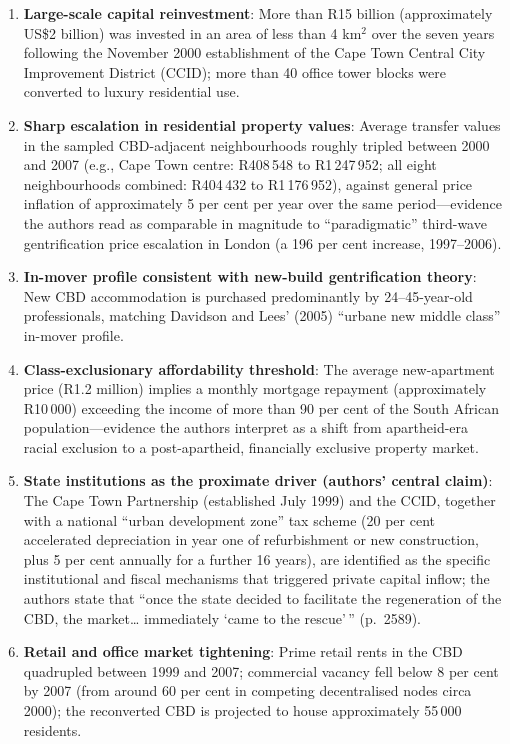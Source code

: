 \begin{enumerate}
  \item \textbf{Large-scale capital reinvestment}: More than R15 billion (approximately US\$2 billion) was invested in an area of less than 4 km$^2$ over the seven years following the November 2000 establishment of the Cape Town Central City Improvement District (CCID); more than 40 office tower blocks were converted to luxury residential use.
  \item \textbf{Sharp escalation in residential property values}: Average transfer values in the sampled CBD-adjacent neighbourhoods roughly tripled between 2000 and 2007 (e.g., Cape Town centre: R408\,548 to R1\,247\,952; all eight neighbourhoods combined: R404\,432 to R1\,176\,952), against general price inflation of approximately 5 per cent per year over the same period---evidence the authors read as comparable in magnitude to ``paradigmatic'' third-wave gentrification price escalation in London (a 196 per cent increase, 1997--2006).
  \item \textbf{In-mover profile consistent with new-build gentrification theory}: New CBD accommodation is purchased predominantly by 24--45-year-old professionals, matching Davidson and Lees' (2005) ``urbane new middle class'' in-mover profile.
  \item \textbf{Class-exclusionary affordability threshold}: The average new-apartment price (R1.2 million) implies a monthly mortgage repayment (approximately R10\,000) exceeding the income of more than 90 per cent of the South African population---evidence the authors interpret as a shift from apartheid-era racial exclusion to a post-apartheid, financially exclusive property market.
  \item \textbf{State institutions as the proximate driver (authors' central claim)}: The Cape Town Partnership (established July 1999) and the CCID, together with a national ``urban development zone'' tax scheme (20 per cent accelerated depreciation in year one of refurbishment or new construction, plus 5 per cent annually for a further 16 years), are identified as the specific institutional and fiscal mechanisms that triggered private capital inflow; the authors state that ``once the state decided to facilitate the regeneration of the CBD, the market\ldots{} immediately `came to the rescue'\,'' (p.~2589).
  \item \textbf{Retail and office market tightening}: Prime retail rents in the CBD quadrupled between 1999 and 2007; commercial vacancy fell below 8 per cent by 2007 (from around 60 per cent in competing decentralised nodes circa 2000); the reconverted CBD is projected to house approximately 55\,000 residents.

\end{enumerate}
